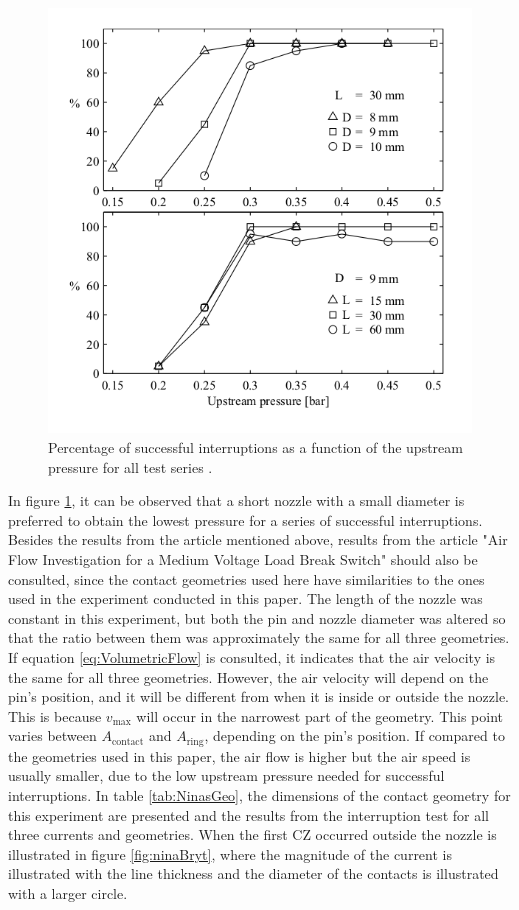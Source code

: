 \documentclass[10pt,a4paper,twoside]{article}
\begin{document}
\begin{figure}[H]
  \centering
  \includegraphics[scale=0.5]{Bilder/Discussion/percentSuccMVLBS.png}
  \caption{Percentage of successful interruptions as a function of the upstream pressure for all test series \cite{bib:CIAMVLBS}.}
  \label{fig:resultsCIMALBS}
\end{figure}

In figure \ref{fig:resultsCIMALBS}, it can be observed that a short nozzle with a small diameter is preferred to obtain the lowest pressure for a series of successful interruptions. Besides the results from the article mentioned above, results from the article "Air Flow Investigation for a Medium Voltage Load Break Switch" \cite{bib:AFIMVLBA} should also be consulted, since the contact geometries used here have similarities to the ones used in the experiment conducted in this paper. The length of the nozzle was constant in this experiment, but both the pin and nozzle diameter was altered so that the ratio between them was approximately the same for all three geometries. If equation \eqref{eq:VolumetricFlow} is consulted, it indicates that the air velocity is the same for all three geometries. However, the air velocity will depend on the pin's position, and it will be different from when it is inside or outside the nozzle. This is because $v_\mathrm{{max}}$ will occur in the narrowest part of the geometry. This point varies between $A_\mathrm{{contact}}$ and $A_\mathrm{{ring}}$, depending on the pin's position. If compared to the geometries used in this paper, the air flow is higher but the air speed is usually smaller, due to the low upstream pressure needed for successful interruptions. In table \ref{tab:NinasGeo}, the dimensions of the contact geometry for this experiment are presented and the results from the interruption test for all three currents and geometries. When the first CZ occurred outside the nozzle is illustrated in figure \ref{fig:ninaBryt}, where the magnitude of the current is illustrated with the line thickness and the diameter of the contacts is illustrated with a larger circle.
\end{document}
